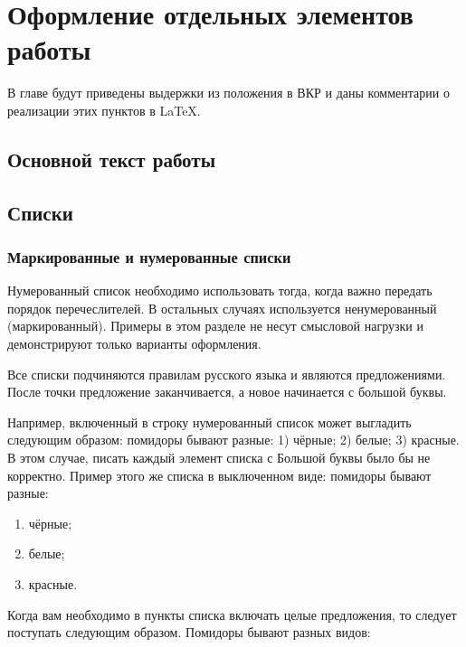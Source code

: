 \section{Оформление отдельных элементов работы}

В главе будут приведены выдержки из положения в ВКР \cite{stankin:vkr} и даны комментарии о реализации этих пунктов в \LaTeX{}.



\subsection{Основной текст работы}




\subsection{Списки}


\subsubsection{Маркированные и нумерованные списки}


Нумерованный список необходимо использовать тогда, когда важно передать порядок перечеслителей. В остальных случаях используется ненумерованный (маркированный). Примеры в этом разделе не несут смысловой нагрузки и демонстрируют только варианты оформления.

Все списки подчиняются правилам русского языка и являются предложениями. После точки предложение заканчивается, а новое начинается с большой буквы.

Например, включенный в строку нумерованный список может выгладить следующим образом: помидоры бывают разные: 1) чёрные; 2) белые; 3) красные. В этом случае, писать каждый элемент списка с Большой буквы было бы не корректно. Пример этого же списка в выключенном виде: помидоры бывают разные:
\begin{enumerate}[label = \arabic*)]
	\item {}%
			чёрные; 
	\item белые; 
	\item красные.
\end{enumerate}




Когда вам необходимо в пункты списка включать целые предложения, то следует поступать следующим образом. Помидоры  бывают разных видов:

